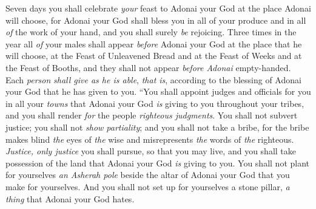 \begin{biblechapter}
\verse Seven days you shall celebrate \textit{your} feast to Adonai your God at the place Adonai will choose, for Adonai your God shall bless you in all of your produce and in all \textit{of} the work of your hand, and you shall surely \textit{be} rejoicing.
\verse Three times in the year all \textit{of} your males shall appear \textit{before } Adonai your God at the place that he will choose, at the Feast of Unleavened Bread and at the Feast of Weeks and at the Feast of Booths, and they shall not appear \textit{before Adonai} empty-handed.
\verse Each \textit{person} \textit{shall give as he is able}, \textit{that is}, according to the blessing of Adonai your God that he has given to you.
\verse “You shall appoint judges and officials for you in all your \textit{towns} that Adonai your God \textit{is} giving to you throughout your tribes, and you shall render \textit{for} the people \textit{righteous judgments}.
\verse You shall not subvert justice; you shall not \textit{show partiality}; and you shall not take a bribe, for the bribe makes blind \textit{the} eyes of \textit{the} wise and misrepresents \textit{the} words of \textit{the} righteous.
\verse \textit{Justice, only justice} you shall pursue, so that you may live, and you shall take possession of the land that Adonai your God \textit{is} giving to you.
\verse You shall not plant for yourselves \textit{an Asherah pole} beside the altar of Adonai your God that you make for yourselves.
\verse And you shall not set up for yourselves a stone pillar, \textit{a thing} that Adonai your God hates.
\end{biblechapter}


